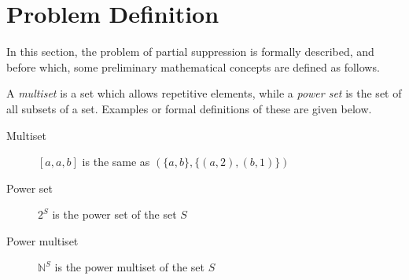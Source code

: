 \section{Problem Definition}
\label{sec:prob}

In this section, the problem of partial suppression is formally described,
and before which, some preliminary mathematical concepts are defined as
follows.


A {\em multiset} is a set which allows repetitive elements, while a {\em
power set} is the set of all subsets of a set. Examples or formal definitions
of these are given below.
\begin{description}
  \item[Multiset] \hspace{2em} $[a,a,b]$ is the same as
      $(\{a,b\},\{(a,2),(b,1)\})$
  \item[Power set]  \hspace{2em}  $2^S$ is the power set of the set $S$
  \item[Power multiset] \hspace{4em} $\mathbb{N}^S$ is the power multiset
      of the set $S$
\end{description}

